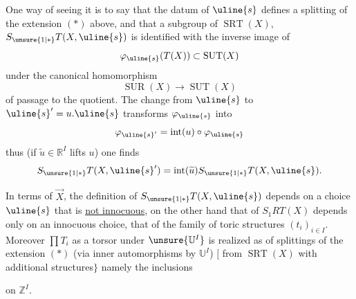 
One way of seeing it is to say that
the datum of $\uline{s}$ defines a splitting
 of
the extension $(*)$ above, and that 
a subgroup of $\operatorname{SRT}(X)$,
$S_{\unsure{1|*}}T(X,\uline{s})$ is identified
with the inverse image of
\[
\varphi_{\uline{s}}(T(X))\subset\operatorname{SUT}(X)
\]
under the canonical homomorphism
\[
\operatorname{SUR}(X)\longrightarrow\operatorname{SUT}(X)
\]
of passage to the quotient. The change from
$\uline{s}$ to $\uline{s}'=u.\uline{s}$
transforms $\varphi_{\uline{s}}$ into
\[
\varphi_{\uline{s}'}=\operatorname{int}(u)\circ\varphi_{\uline{s}}
\]
thus (if $\widetilde u\in\mathbb R^I$ lifts $u$) one finds
\[
S_{\unsure{1|*}}T(X,\uline{s}')
=\operatorname{int}(\widetilde u)S_{\unsure{1|*}}T(X,\uline{s}).
\]

In terms of $\vec X$, the definition of
$S_{\unsure{1|*}}T(X,\uline{s})$
depends on a choice $\uline{s}$ that is \uline{not innocuous},
on the other hand that of $S_1RT(X)$ depends only on
an innocuous choice, that of the family of
toric structures $(t_i)_{i\in I}$.
Moreover $\prod T_i$ as
a torsor under $\unsure{\mathbb U^I}$ is realized
as  of splittings of the extension $(*)$
(via inner automorphisms by $\mathbb U^I$)
$\bigl[$ from $\operatorname{SRT}(X)$
with  additional structures$\bigr\}$
namely\unsure{)|,} the inclusions


 on $\mathbb Z^I$.

